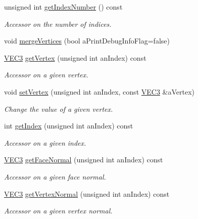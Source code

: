 \begin{DoxyCompactItemize}
unsigned int \hyperlink{class_graphics_1_1_triangle_mesh_aa01446e2ed9291d7e69a9f1331cc997c}{getIndexNumber} () const 
\begin{DoxyCompactList}\small\item\em Accessor on the number of indices. \end{DoxyCompactList}\item 
void \hyperlink{class_graphics_1_1_triangle_mesh_a0ab4dddfc90950050ed9a4f64d9d5490}{mergeVertices} (bool aPrintDebugInfoFlag=false)
\item 
\hyperlink{class_math_1_1_vec3}{VEC3} \hyperlink{class_graphics_1_1_triangle_mesh_a7db528220a52978dbb80257a3955c3d3}{getVertex} (unsigned int anIndex) const 
\begin{DoxyCompactList}\small\item\em Accessor on a given vertex. \end{DoxyCompactList}\item 
void \hyperlink{class_graphics_1_1_triangle_mesh_a156fbcd7e56d166bf84606e2943ac15c}{setVertex} (unsigned int anIndex, const \hyperlink{class_math_1_1_vec3}{VEC3} \&aVertex)
\begin{DoxyCompactList}\small\item\em Change the value of a given vertex. \end{DoxyCompactList}\item 
int \hyperlink{class_graphics_1_1_triangle_mesh_a30d4abe2c11fa5b0881d8ce6a4269000}{getIndex} (unsigned int anIndex) const 
\begin{DoxyCompactList}\small\item\em Accessor on a given index. \end{DoxyCompactList}\item 
\hyperlink{class_math_1_1_vec3}{VEC3} \hyperlink{class_graphics_1_1_triangle_mesh_a3a3fb5d36f569957094a7da26fbca1e2}{getFaceNormal} (unsigned int anIndex) const 
\begin{DoxyCompactList}\small\item\em Accessor on a given face normal. \end{DoxyCompactList}\item 
\hyperlink{class_math_1_1_vec3}{VEC3} \hyperlink{class_graphics_1_1_triangle_mesh_ab0fc7baa1436c4386fa53529b8cea886}{getVertexNormal} (unsigned int anIndex) const 
\begin{DoxyCompactList}\small\item\em Accessor on a given vertex normal. \end{DoxyCompactList}\item 

\end{DoxyCompactItemize}
